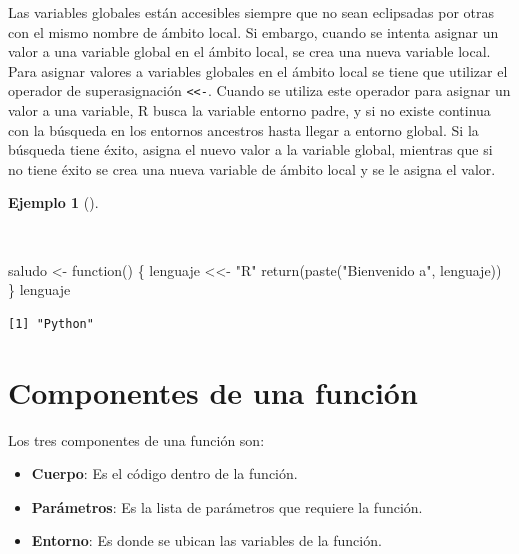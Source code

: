 \documentclass[
  a4paper,
]{scrreport}
\newenvironment{Shaded}{\begin{snugshade}}{\end{snugshade}}
\newcommand{\ControlFlowTok}[1]{\textcolor[rgb]{0.00,0.23,0.31}{#1}}
\newcommand{\FunctionTok}[1]{\textcolor[rgb]{0.28,0.35,0.67}{#1}}
\newcommand{\NormalTok}[1]{\textcolor[rgb]{0.00,0.23,0.31}{#1}}
\newcommand{\OtherTok}[1]{\textcolor[rgb]{0.00,0.23,0.31}{#1}}
\newcommand{\StringTok}[1]{\textcolor[rgb]{0.13,0.47,0.30}{#1}}
\providecommand{\tightlist}{%
  \setlength{\itemsep}{0pt}\setlength{\parskip}{0pt}}\usepackage{longtable,booktabs,array}
\theoremstyle{definition}
\theoremstyle{definition}
\newtheorem{example}{Ejemplo}[chapter]
\theoremstyle{remark}
\begin{document}
Las variables globales están accesibles siempre que no sean eclipsadas
por otras con el mismo nombre de ámbito local. Si embargo, cuando se
intenta asignar un valor a una variable global en el ámbito local, se
crea una nueva variable local. Para asignar valores a variables globales
en el ámbito local se tiene que utilizar el operador de superasignación
\texttt{\textless{}\textless{}-}. Cuando se utiliza este operador para
asignar un valor a una variable, R busca la variable entorno padre, y si
no existe continua con la búsqueda en los entornos ancestros hasta
llegar a entorno global. Si la búsqueda tiene éxito, asigna el nuevo
valor a la variable global, mientras que si no tiene éxito se crea una
nueva variable de ámbito local y se le asigna el valor.

\begin{example}[]\protect\hypertarget{exm-superasignacion}{}\label{exm-superasignacion}

~

\begin{Shaded}
\begin{Highlighting}[]
\NormalTok{saludo }\OtherTok{\textless{}{-}} \ControlFlowTok{function}\NormalTok{() \{}
\NormalTok{  lenguaje }\OtherTok{\textless{}\textless{}{-}} \StringTok{"R"}
  \FunctionTok{return}\NormalTok{(}\FunctionTok{paste}\NormalTok{(}\StringTok{"Bienvenido a"}\NormalTok{, lenguaje))}
\NormalTok{\}}
\NormalTok{lenguaje}
\end{Highlighting}
\end{Shaded}

\begin{verbatim}
[1] "Python"
\end{verbatim}

\end{example}

\hypertarget{componentes-de-una-funciuxf3n}{%
\section{Componentes de una
función}\label{componentes-de-una-funciuxf3n}}

Los tres componentes de una función son:

\begin{itemize}
\tightlist
\item
  \textbf{Cuerpo}: Es el código dentro de la función.
\item
  \textbf{Parámetros}: Es la lista de parámetros que requiere la
  función.
\item
  \textbf{Entorno}: Es donde se ubican las variables de la función.
\end{itemize}
\end{document}
